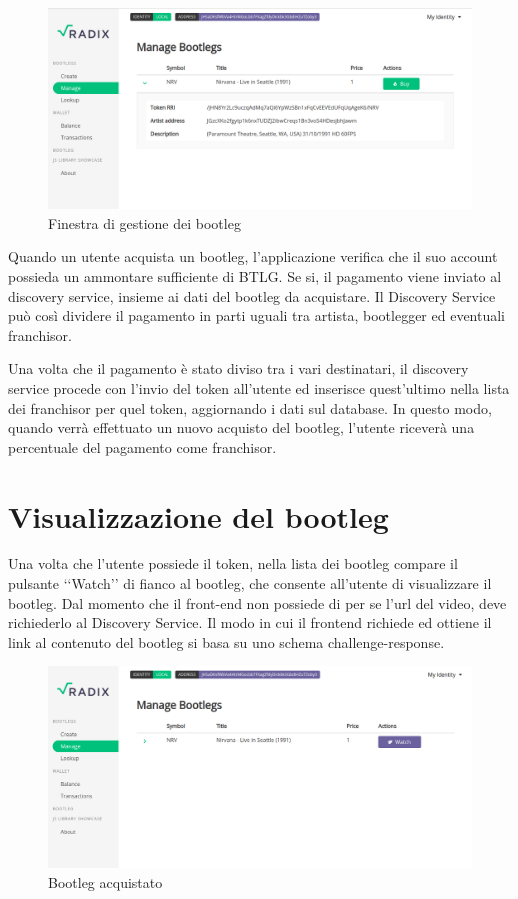 \begin{figure}[H]
    \includegraphics[width=\linewidth]{images/application/manage-bootleg2.png}
    \caption{Finestra di gestione dei bootleg}
    \label{fig:manage_bootleg}
\end{figure}

Quando un utente acquista un bootleg, l'applicazione verifica che il suo account possieda un ammontare sufficiente di BTLG. Se si, il pagamento viene inviato al discovery service, insieme ai dati del bootleg da acquistare. Il Discovery Service può così dividere il pagamento in parti uguali tra artista, bootlegger ed eventuali franchisor.

Una volta che il pagamento è stato diviso tra i vari destinatari, il discovery service procede con l'invio del token all'utente ed inserisce quest'ultimo nella lista dei franchisor per quel token, aggiornando i dati sul database. In questo modo, quando verrà effettuato un nuovo acquisto del bootleg, l'utente riceverà una percentuale del pagamento come franchisor. 

\section{Visualizzazione del bootleg}

Una volta che l'utente possiede il token, nella lista dei bootleg compare il pulsante ‘‘Watch’’ di fianco al bootleg, che consente all'utente di visualizzare il bootleg. Dal momento che il front-end non possiede di per se l'url del video, deve richiederlo al Discovery Service. Il modo in cui il frontend richiede ed ottiene il link al contenuto del bootleg si basa su uno schema challenge-response. 

\begin{figure}[H]
    \includegraphics[width=\linewidth]{images/application/bootleg-purchased.png}
    \caption{Bootleg acquistato}
    \label{fig:bootleg_purchased}
\end{figure}

